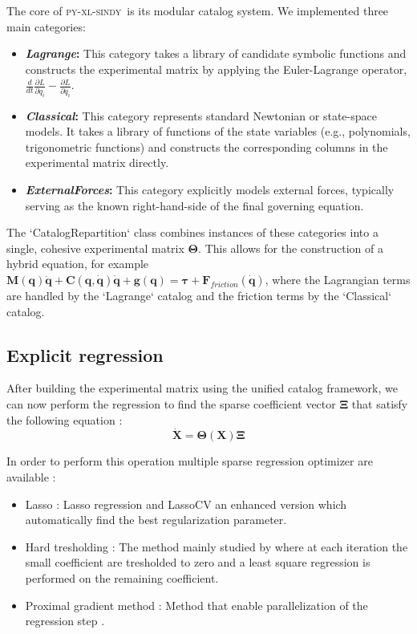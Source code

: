 \documentclass[12pt]{article}
\newcommand{\frameworkname}{\textsc{py-xl-sindy}}
\newcommand{\lagrangecat}{\textit{Lagrange}}
\newcommand{\classicalcat}{\textit{Classical}}
\newcommand{\forcescat}{\textit{ExternalForces}}
\begin{document}
The core of \frameworkname\ is its modular catalog system. We implemented three main categories:
\begin{itemize}
    \item \textbf{\lagrangecat:} This category takes a library of candidate symbolic functions and constructs the experimental matrix by applying the Euler-Lagrange operator, $\frac{d}{dt}\frac{\partial L}{\partial \dot{q}_i} - \frac{\partial L}{\partial q_i}$.
    \item \textbf{\classicalcat:} This category represents standard Newtonian or state-space models. It takes a library of functions of the state variables (e.g., polynomials, trigonometric functions) and constructs the corresponding columns in the experimental matrix directly.
    \item \textbf{\forcescat:} This category explicitly models external forces, typically serving as the known right-hand-side of the final governing equation.
\end{itemize}
The `CatalogRepartition` class combines instances of these categories into a single, cohesive experimental matrix $\mathbf{\Theta}$. This allows for the construction of a hybrid equation, for example $\mathbf{M}(\mathbf{q})\ddot{\mathbf{q}} + \mathbf{C}(\mathbf{q},\dot{\mathbf{q}})\dot{\mathbf{q}} + \mathbf{g}(\mathbf{q}) = \mathbf{\tau} + \mathbf{F}_{friction}(\dot{\mathbf{q}})$, where the Lagrangian terms are handled by the `Lagrange` catalog and the friction terms by the `Classical` catalog.

\subsection*{Explicit regression}

After building the experimental matrix using the unified catalog framework, we can now perform the regression to find the sparse coefficient vector $\mathbf{\Xi}$ that satisfy the following equation :
\begin{equation}
	\dot{\mathbf{X}} = \mathbf{\Theta}(\mathbf{X})\mathbf{\Xi}
\end{equation}

In order to perform this operation multiple sparse regression optimizer are available :
\begin{itemize}
	\item Lasso : Lasso regression and LassoCV an enhanced version which automatically find the best regularization parameter.
	\item Hard tresholding : The method mainly studied by \cite{Brunton2016_SINDy} where at each iteration the small coefficient are tresholded to zero and a least square regression is performed on the remaining coefficient.
	\item Proximal gradient method : Method that enable parallelization of the regression step \cite{purnomoSparseIdentificationLagrangian2023}.
\end{itemize}
\end{document}
